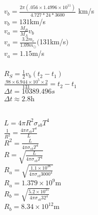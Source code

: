 \documentclass{article}
\begin{document}
\subsubsection{}
\begin{center}
\(v_b = \frac{2\pi (.056 \times 1.4996 \times 10^{11})}{4.727 * 24 * 3600}\) km/s \\

\(v_b = 131\)km/s \\
\vspace{6mm}
\(v_a = \frac{M_B}{M_A}v_b\)\\
\(v_a = \frac{3.2m_e}{1.09m_\odot}(\)131km/s\()\)\\
\(v_a = 1.15\)m/s \\
\end{center}

\subsubsection{}

\begin{center}
    \(R_S = \frac{1}{2} v_b(t_2 - t_1)\)\\
    \(\frac{.98 \times 6.944 \times 10^5 \times 2 }{131} = t_2 - t_1 \)\\
    \(\Delta t = 10389.496s\)\\
    \(\Delta t \approx 2.8\)h
    
\end{center}

\begin{center}
    
\end{center}

\subsection{}
\subsubsection{}
\begin{center}
    \(L = 4\pi R^2\sigma_{sb} T^4\)\\
    \(\frac{1}{R^2} = \frac{4\pi\sigma_{sb} T^4}{L}\) \\
    \({R^2} = \frac{L}{4\pi\sigma_{sb} T^4}\)\\
    \({R} = \sqrt{\frac{L}{4\pi\sigma_{sb} T^4}}\)
    \vspace{5mm} \\
    \(R_a = \sqrt{\frac{1.1 \times 10^{26}}{4\pi \sigma_{sb} 3000^4}}\)\\
    \(R_a = 1.379 \times 10^{9}\)m\\
    \vspace{5mm}
    \(R_b = \sqrt{\frac{5.2 \times 10^{25}}{4\pi \sigma_{sb} 32^4}}\)\\
    \(R_b = 8.34 \times 10^{12}\)m
    \end{center}
\end{document}
